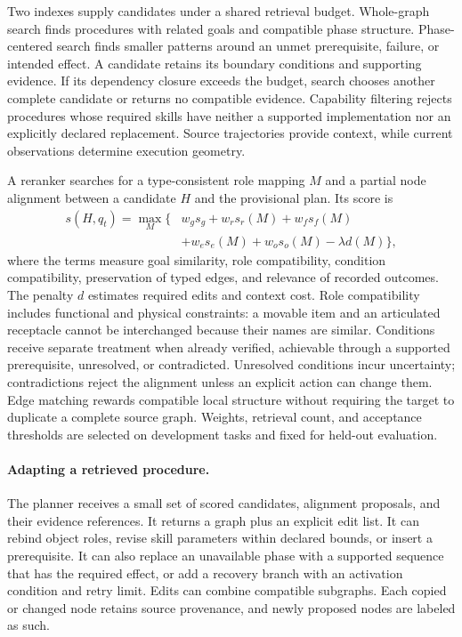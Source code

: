 \documentclass[10pt,twocolumn,letterpaper]{article}
\begin{document}
Two indexes supply candidates under a shared retrieval budget. Whole-graph search finds procedures with related goals and compatible phase structure. Phase-centered search finds smaller patterns around an unmet prerequisite, failure, or intended effect. A candidate retains its boundary conditions and supporting evidence. If its dependency closure exceeds the budget, search chooses another complete candidate or returns no compatible evidence. Capability filtering rejects procedures whose required skills have neither a supported implementation nor an explicitly declared replacement. Source trajectories provide context, while current observations determine execution geometry.

A reranker searches for a type-consistent role mapping $M$ and a partial node alignment between a candidate $H$ and the provisional plan. Its score is
\begin{equation}
\begin{split}
s(H,q_t)=\max_M\{&w_g s_g+w_r s_r(M)+w_f s_f(M)\\
                &+w_e s_e(M)+w_o s_o(M)-\lambda d(M)\},
\end{split}
\label{eq:alignment-score}
\end{equation}
where the terms measure goal similarity, role compatibility, condition compatibility, preservation of typed edges, and relevance of recorded outcomes. The penalty $d$ estimates required edits and context cost. Role compatibility includes functional and physical constraints: a movable item and an articulated receptacle cannot be interchanged because their names are similar. Conditions receive separate treatment when already verified, achievable through a supported prerequisite, unresolved, or contradicted. Unresolved conditions incur uncertainty; contradictions reject the alignment unless an explicit action can change them. Edge matching rewards compatible local structure without requiring the target to duplicate a complete source graph. Weights, retrieval count, and acceptance thresholds are selected on development tasks and fixed for held-out evaluation.

\paragraph{Adapting a retrieved procedure.}
The planner receives a small set of scored candidates, alignment proposals, and their evidence references. It returns a graph plus an explicit edit list. It can rebind object roles, revise skill parameters within declared bounds, or insert a prerequisite. It can also replace an unavailable phase with a supported sequence that has the required effect, or add a recovery branch with an activation condition and retry limit. Edits can combine compatible subgraphs. Each copied or changed node retains source provenance, and newly proposed nodes are labeled as such.
\end{document}

